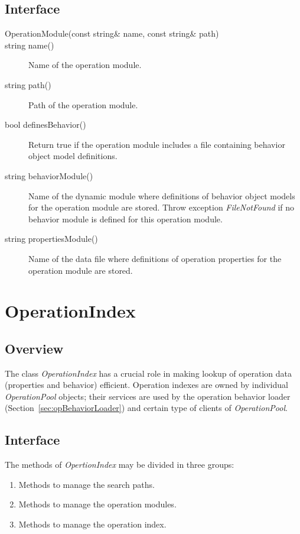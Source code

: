 \documentclass[a4paper,twoside]{tce}
\begin{document}
\subsection{Interface}

\begin{description}
\item[OperationModule(const string\& name, const string\& path)]
\item[string name()]%
  Name of the operation module.
\item[string path()]%
  Path of the operation module.
\item[bool definesBehavior()]%
  Return true if the operation module includes a file containing behavior
  object model definitions.
\item[string behaviorModule()]%
  Name of the dynamic module where definitions of behavior object models
  for the operation module are stored.  Throw exception \emph{FileNotFound}
  if no behavior module is defined for this operation module.
\item[string propertiesModule()]%
  Name of the data file where definitions of operation properties for the
  operation module are stored.
\end{description}

\section{OperationIndex}
\label{sec:opIndex}

\subsection{Overview}

The class \emph{OperationIndex} has a crucial role in making lookup of
operation data (properties and behavior) efficient.  Operation indexes are
owned by individual \emph{OperationPool} objects; their services are used by
the operation behavior loader (Section~\ref{sec:opBehaviorLoader}) and
certain type of clients of \emph{OperationPool}.


\subsection{Interface}

The methods of \emph{OpertionIndex} may be divided in three groups:
\begin{enumerate}
\item Methods to manage the search paths.
\item Methods to manage the operation modules.
\item Methods to manage the operation index.
\end{enumerate}
\end{document}
